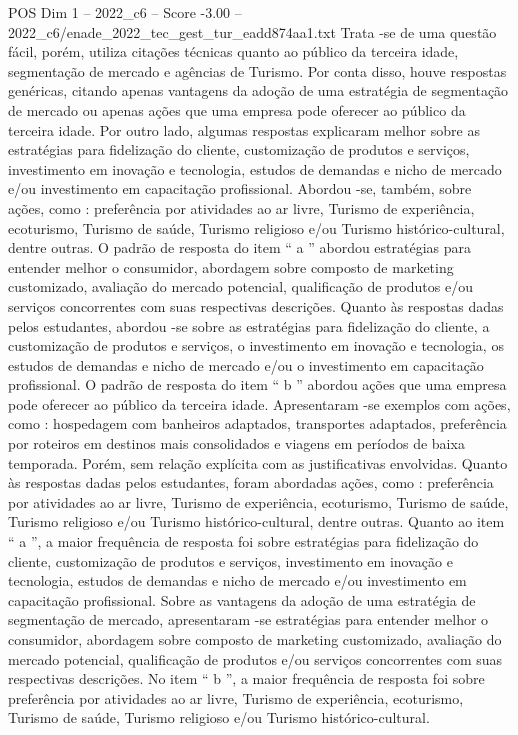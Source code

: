 \begin{textsample}{POS Dim 1 – 2022\_c6 – Score -3.00 – 2022\_c6/enade\_2022\_tec\_gest\_tur\_eadd874aa1.txt}
Trata -se de uma questão fácil, porém, utiliza citações técnicas quanto ao público da terceira idade, segmentação de mercado e agências de Turismo.
Por conta disso, houve respostas genéricas, citando apenas vantagens da adoção de uma estratégia de segmentação de mercado ou apenas ações que uma empresa pode oferecer ao público da terceira idade.
Por outro lado, algumas respostas explicaram melhor sobre as estratégias para fidelização do cliente, customização de produtos e serviços, investimento em inovação e tecnologia, estudos de demandas e nicho de mercado e/ou investimento em capacitação profissional.
Abordou -se, também, sobre ações, como : preferência por atividades ao ar livre, Turismo de experiência, ecoturismo, Turismo de saúde, Turismo religioso e/ou Turismo histórico-cultural, dentre outras.
O padrão de resposta do item “ a ” abordou estratégias para entender melhor o consumidor, abordagem sobre composto de marketing customizado, avaliação do mercado potencial, qualificação de produtos e/ou serviços concorrentes com suas respectivas descrições.
Quanto às respostas dadas pelos estudantes, abordou -se sobre as estratégias para fidelização do cliente, a customização de produtos e serviços, o investimento em inovação e tecnologia, os estudos de demandas e nicho de mercado e/ou o investimento em capacitação profissional.
O padrão de resposta do item “ b ” abordou ações que uma empresa pode oferecer ao público da terceira idade.
Apresentaram -se exemplos com ações, como : hospedagem com banheiros adaptados, transportes adaptados, preferência por roteiros em destinos mais consolidados e viagens em períodos de baixa temporada.
Porém, sem relação explícita com as justificativas envolvidas.
Quanto às respostas dadas pelos estudantes, foram abordadas ações, como : preferência por atividades ao ar livre, Turismo de experiência, ecoturismo, Turismo de saúde, Turismo religioso e/ou Turismo histórico-cultural, dentre outras.
Quanto ao item “ a ”, a maior frequência de resposta foi sobre estratégias para fidelização do cliente, customização de produtos e serviços, investimento em inovação e tecnologia, estudos de demandas e nicho de mercado e/ou investimento em capacitação profissional.
Sobre as vantagens da adoção de uma estratégia de segmentação de mercado, apresentaram -se estratégias para entender melhor o consumidor, abordagem sobre composto de marketing customizado, avaliação do mercado potencial, qualificação de produtos e/ou serviços concorrentes com suas respectivas descrições.
No item “ b ”, a maior frequência de resposta foi sobre preferência por atividades ao ar livre, Turismo de experiência, ecoturismo, Turismo de saúde, Turismo religioso e/ou Turismo histórico-cultural.

\end{textsample}
